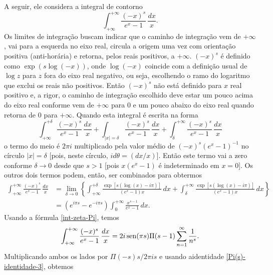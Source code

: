     A seguir, ele considera a integral de contorno 
    \begin{equation*}
        \int_{+\infty}^{+\infty} \frac{(-x)^s}{e^x - 1} \, \frac{dx}{x}.
    \end{equation*}
    Os limites de integração buscam indicar que o caminho de integração vem de $+\infty$, vai para a esquerda no eixo real, circula a origem uma vez com orientação positiva (anti-horária) e retorna, pelos reais positivos, a $+\infty$. $(-x)^s$ é definido como $\exp(s\log(-x))$, onde $\log(-x)$ coincide com a definição usual de $\log z$ para $z$ fora do eixo real negativo, ou seja, escolhendo o ramo do logaritmo que exclui os reais não positivos. Então $(-x)^s$ não está definido para $x$ real positivo e, a rigor, o caminho de integração escolhido deve estar um pouco acima do eixo real conforme vem de $+\infty$ para $0$ e um pouco abaixo do eixo real quando retorna de 0 para $+\infty$. Quando esta integral é escrita na forma 
    \begin{equation*}
         \int_{+\infty}^{+\delta} \frac{(-x)^s}{e^x - 1} \, \frac{dx}{x} +  \int_{|x| = \delta} \frac{(-x)^s}{e^x - 1} \, \frac{dx}{x} + \int_{\delta}^{+\infty} \frac{(-x)^s}{e^x - 1} \, \frac{dx}{x}
    \end{equation*}
    o termo do meio é $2\pi i$ multiplicado pela valor médio de $(-x)^s(e^x - 1)^{-1}$ no círculo $|x| = \delta$ [pois, neste círculo, $i d\theta = (dx/x)$]. Então este termo vai a zero conforme $\delta \to 0$ desde que $s>1$ [pois $x(e^x -1)$ é indeterminado em $x = 0$]. Os outros dois termos podem, então, ser combinados para obtermos 
    \begin{align*}
        \int_{+\infty}^{+\infty} \frac{(-x)^s}{e^x - 1} \, \frac{dx}{x}
        &= \lim_{\delta \to 0} \left\{ \int_{+\infty}^{+\delta} \frac{\exp[s(\log(x)-i\pi)]}{(e^x - 1)x} \, dx + \int_{\delta}^{+\infty} \frac{\exp[s(\log(x)-i\pi)]}{(e^x - 1)x} \, dx \right\} \\
        &= (e^{i\pi s} - e^{-i\pi s})\int_{0}^{+\infty} \frac{x^{s-1} }{e^x - 1} \, dx.
    \end{align*}
    Usando a fórmula \eqref{int-zeta-Pi}, temos
    \begin{equation*}
        \int_{+\infty}^{+\infty} \frac{(-x)^s}{e^x - 1} \, \frac{dx}{x} = 2 i \operatorname{sen}(\pi s)\Pi(s-1)\sum_{n=1}^{\infty}\frac{1}{n^s}.
    \end{equation*}
    Multiplicando ambos os lados por $\Pi(-s)s/2\pi i s$ e usando aidentidade \eqref{Pi(s)-identidade-3}, obtemos
